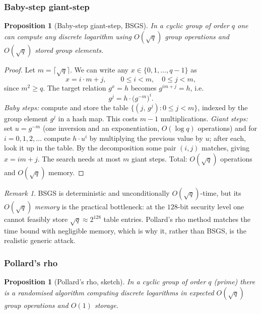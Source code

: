 \documentclass[11pt,a4paper]{article}
\newtheorem{proposition}[theorem]{Proposition}
\theoremstyle{definition}
\theoremstyle{remark}
\newtheorem{remark}[theorem]{Remark}
\begin{document}
\subsubsection*{Baby-step giant-step}

\begin{proposition}[Baby-step giant-step, BSGS]
\label{assumptions:prop:bsgs}
In a cyclic group of order \(q\) one can compute any discrete logarithm using \(O(\sqrt q)\) group operations and \(O(\sqrt q)\) stored group elements.
\end{proposition}

\begin{proof}
Let \(m = \lceil \sqrt q \rceil\). We can write any \(x \in \{0, 1, \dots, q-1\}\) as
\[
x = i \cdot m + j, \qquad 0 \le i < m, \quad 0 \le j < m,
\]
since \(m^2 \ge q\). The target relation \(g^x = h\) becomes \(g^{im + j} = h\), i.e.
\[
g^{j} = h \cdot \bigl(g^{-m}\bigr)^{i}.
\]
\emph{Baby steps:} compute and store the table \(\{(j,\, g^{j}) : 0 \le j < m\}\), indexed by the group element \(g^j\) in a hash map. This costs \(m-1\) multiplications. \emph{Giant steps:} set \(u = g^{-m}\) (one inversion and an exponentiation, \(O(\log q)\) operations) and for \(i = 0, 1, 2, \dots\) compute \(h \cdot u^{i}\) by multiplying the previous value by \(u\); after each, look it up in the table. By the decomposition some pair \((i,j)\) matches, giving \(x = im + j\). The search needs at most \(m\) giant steps. Total: \(O(\sqrt q)\) operations and \(O(\sqrt q)\) memory.
\end{proof}

\begin{remark}
\label{assumptions:rem:bsgs-memory}
BSGS is deterministic and unconditionally \(O(\sqrt q)\)-time, but its \(O(\sqrt q)\) \emph{memory} is the practical bottleneck: at the \(128\)-bit security level one cannot feasibly store \(\sqrt q \approx 2^{128}\) table entries. Pollard's rho method matches the time bound with negligible memory, which is why it, rather than BSGS, is the realistic generic attack.
\end{remark}

\subsubsection*{Pollard's rho}

\begin{proposition}[Pollard's rho, sketch]
\label{assumptions:prop:rho}
In a cyclic group of order \(q\) (prime) there is a randomised algorithm computing discrete logarithms in expected \(O(\sqrt q)\) group operations and \(O(1)\) storage.
\end{proposition}
\end{document}

